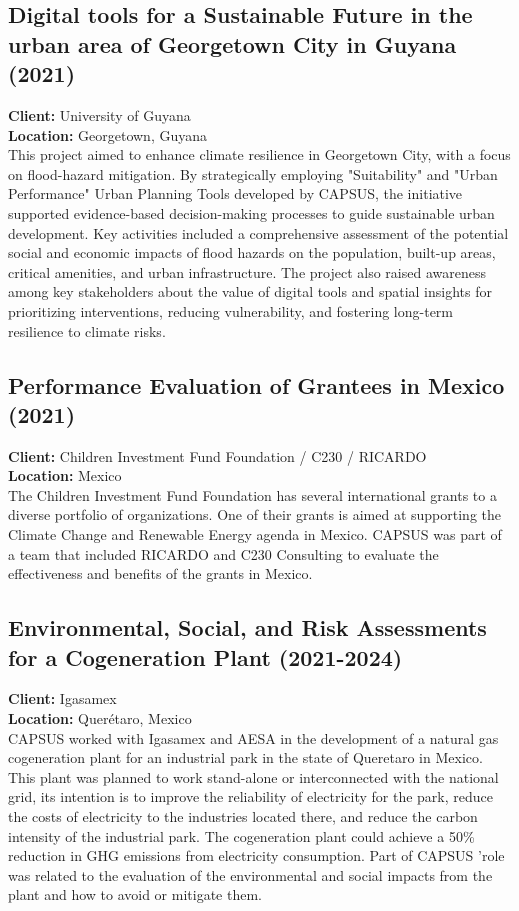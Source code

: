 \documentclass[
	a4paper,
	12pt,
	unnumberedsections,
]{CSSullivanBusinessReport}
\begin{document}
\subsection{Digital tools for a Sustainable Future in the urban area of Georgetown City in Guyana (2021)}
\textbf{Client:}  University of Guyana \\
\textbf{Location:}   Georgetown, Guyana \\[0.5em]
 This project aimed to enhance climate resilience in Georgetown City, with a focus on flood-hazard mitigation. By strategically employing "Suitability" and "Urban Performance" Urban Planning Tools developed by CAPSUS, the initiative supported evidence-based decision-making processes to guide sustainable urban development. Key activities included a comprehensive assessment of the potential social and economic impacts of flood hazards on the population, built-up areas, critical amenities, and urban infrastructure. The project also raised awareness among key stakeholders about the value of digital tools and spatial insights for prioritizing interventions, reducing vulnerability, and fostering long-term resilience to climate risks.

\subsection{Performance Evaluation of Grantees in Mexico (2021)}
\textbf{Client:}  Children Investment Fund Foundation / C230 / RICARDO \\
\textbf{Location:}  Mexico   \\[0.5em]
 The Children Investment Fund Foundation has several international grants to a diverse portfolio of organizations. One of their grants is aimed at supporting the Climate Change and Renewable Energy agenda in Mexico. CAPSUS was part of a team that included RICARDO and C230 Consulting to evaluate the effectiveness and benefits of the grants in Mexico.

\subsection{Environmental, Social, and Risk Assessments for a Cogeneration Plant (2021-2024)}
\textbf{Client:}  Igasamex \\
\textbf{Location:}  Querétaro, Mexico \\[0.5em]
 CAPSUS worked with Igasamex and AESA in the development of a natural gas cogeneration plant for an industrial park in the state of Queretaro in Mexico. This plant was planned to work stand-alone or interconnected with the national grid, its intention is to improve the reliability of electricity for the park, reduce the costs of electricity to the industries located there, and reduce the carbon intensity of the industrial park. The cogeneration plant could achieve a 50\% reduction in GHG emissions from electricity consumption. Part of CAPSUS 'role was related to the evaluation of the environmental and social impacts from the plant and how to avoid or mitigate them.
\end{document}
